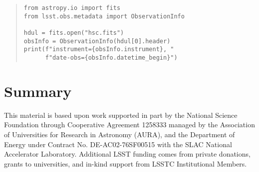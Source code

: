 \documentclass[11pt,twoside]{article}
\begin{document}
\begin{quote}
\begin{small}
\begin{verbatim}
from astropy.io import fits
from lsst.obs.metadata import ObservationInfo

hdul = fits.open("hsc.fits")
obsInfo = ObservationInfo(hdul[0].header)
print(f"instrument={obsInfo.instrument}, "
      f"date-obs={obsInfo.datetime_begin}")
\end{verbatim}
\end{small}
\end{quote}

\section{Summary}

\acknowledgements This material is based upon work supported in part by the National Science Foundation through Cooperative Agreement 1258333 managed by the Association of Universities for Research in Astronomy (AURA), and the Department of Energy under Contract No. DE-AC02-76SF00515 with the SLAC National Accelerator Laboratory.
Additional LSST funding comes from private donations, grants to universities, and in-kind support from LSSTC Institutional Members.

\end{document}
